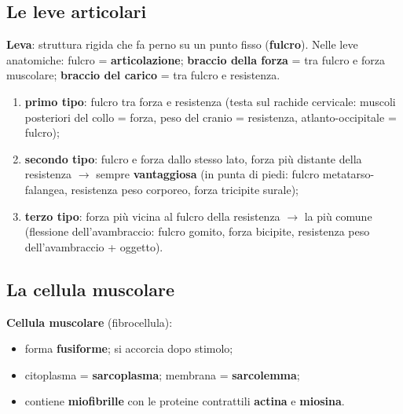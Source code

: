 \subsection{Le leve articolari}
\textbf{Leva}: struttura rigida che fa perno su un punto fisso (\textbf{fulcro}). Nelle leve
anatomiche: fulcro = \textbf{articolazione}; \textbf{braccio della forza} = tra fulcro e forza
muscolare; \textbf{braccio del carico} = tra fulcro e resistenza.
\begin{enumerate}
  \item \textbf{primo tipo}: fulcro tra forza e resistenza (testa sul rachide cervicale: muscoli
    posteriori del collo = forza, peso del cranio = resistenza, atlanto-occipitale = fulcro);
  \item \textbf{secondo tipo}: fulcro e forza dallo stesso lato, forza più distante della
    resistenza $\rightarrow$ sempre \textbf{vantaggiosa} (in punta di piedi: fulcro
    metatarso-falangea, resistenza peso corporeo, forza tricipite surale);
  \item \textbf{terzo tipo}: forza più vicina al fulcro della resistenza $\rightarrow$ la più
    comune (flessione dell'avambraccio: fulcro gomito, forza bicipite, resistenza peso
    dell'avambraccio + oggetto).
\end{enumerate}

\subsection{La cellula muscolare}
\textbf{Cellula muscolare} (fibrocellula):
\begin{itemize}
  \item forma \textbf{fusiforme}; si accorcia dopo stimolo;
  \item citoplasma = \textbf{sarcoplasma}; membrana = \textbf{sarcolemma};
  \item contiene \textbf{miofibrille} con le proteine contrattili \textbf{actina} e \textbf{miosina}.
\end{itemize}
